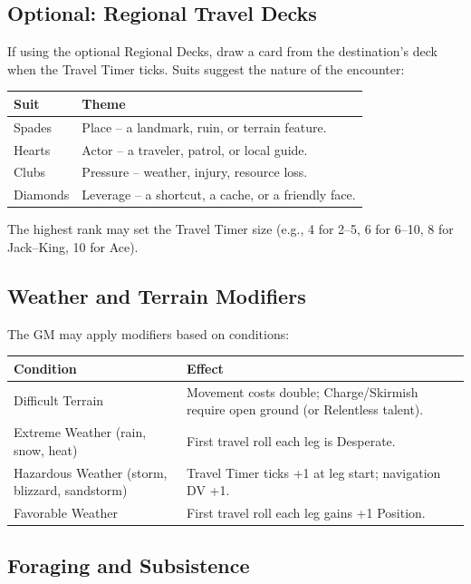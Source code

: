 \subsection{Optional: Regional Travel Decks}

If using the optional Regional Decks, draw a card from the destination's deck when the Travel Timer ticks. Suits suggest the nature of the encounter:

\begin{tabular}{@{}ll@{}}
\toprule
\textbf{Suit} & \textbf{Theme} \\
\midrule
Spades & Place -- a landmark, ruin, or terrain feature. \\
Hearts & Actor -- a traveler, patrol, or local guide. \\
Clubs & Pressure -- weather, injury, resource loss. \\
Diamonds & Leverage -- a shortcut, a cache, or a friendly face. \\
\bottomrule
\end{tabular}

The highest rank may set the Travel Timer size (e.g., 4 for 2--5, 6 for 6--10, 8 for Jack--King, 10 for Ace).

\subsection{Weather and Terrain Modifiers}

The GM may apply modifiers based on conditions:

\begin{tabular}{@{}ll@{}}
\toprule
\textbf{Condition} & \textbf{Effect} \\
\midrule
Difficult Terrain & Movement costs double; Charge/Skirmish require open ground (or Relentless talent). \\
Extreme Weather (rain, snow, heat) & First travel roll each leg is Desperate. \\
Hazardous Weather (storm, blizzard, sandstorm) & Travel Timer ticks +1 at leg start; navigation DV +1. \\
Favorable Weather & First travel roll each leg gains +1 Position. \\
\bottomrule
\end{tabular}

\subsection{Foraging and Subsistence}

